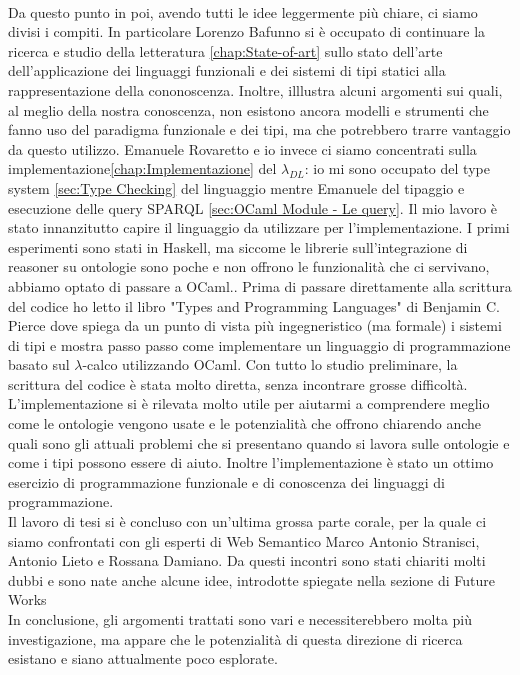 \\Da questo punto in poi, avendo tutti le idee leggermente più chiare, ci siamo divisi i compiti. In particolare Lorenzo Bafunno si
è occupato di continuare la ricerca e studio della letteratura \ref{chap:State-of-art} sullo stato dell'arte dell'applicazione dei linguaggi funzionali e dei sistemi di tipi statici alla rappresentazione della cononoscenza. Inoltre, illlustra alcuni argomenti sui quali, al meglio della nostra conoscenza, non esistono ancora modelli e strumenti che fanno uso del paradigma funzionale e dei tipi, ma che potrebbero trarre vantaggio da questo utilizzo. 
Emanuele Rovaretto e io invece ci siamo concentrati sulla implementazione\ref{chap:Implementazione}
del $\lambda_{DL}$: io mi sono occupato del type system \ref{sec:Type Checking} del linguaggio mentre Emanuele del tipaggio e esecuzione delle query SPARQL \ref{sec:OCaml Module - Le query}.
Il mio lavoro è stato innanzitutto capire il linguaggio da utilizzare per l'implementazione. I primi esperimenti sono stati in Haskell, ma siccome le librerie
sull'integrazione di reasoner su ontologie sono poche e non offrono le funzionalità che ci servivano, abbiamo optato di passare a OCaml.. 
Prima di passare direttamente alla scrittura del codice ho letto il libro "Types and Programming Languages" \cite{TypesAndProgrammingLanguages} di Benjamin C. Pierce dove spiega da un punto di vista
più ingegneristico (ma formale) i sistemi di tipi e mostra passo passo come implementare un linguaggio di programmazione basato sul $\lambda$-calco utilizzando OCaml.
Con tutto lo studio preliminare, la scrittura del codice è stata molto diretta, senza incontrare grosse difficoltà.
\\L'implementazione si è rilevata molto utile per aiutarmi a comprendere meglio come le ontologie vengono usate e le potenzialità che offrono chiarendo anche
quali sono gli attuali problemi che si presentano quando si lavora sulle ontologie e come i tipi possono essere di aiuto. Inoltre l'implementazione è stato un ottimo
esercizio di programmazione funzionale e di conoscenza dei linguaggi di programmazione.
\\Il lavoro di tesi si è concluso con un'ultima grossa parte corale, per la quale ci siamo confrontati con gli esperti
di Web Semantico Marco Antonio Stranisci, Antonio Lieto e Rossana Damiano. Da questi incontri sono stati chiariti molti dubbi e sono nate anche alcune idee, introdotte
spiegate nella sezione di Future Works %
\\In conclusione, gli argomenti trattati sono vari e necessiterebbero molta più investigazione, ma appare che le potenzialità di questa direzione di ricerca esistano e siano attualmente poco esplorate. 